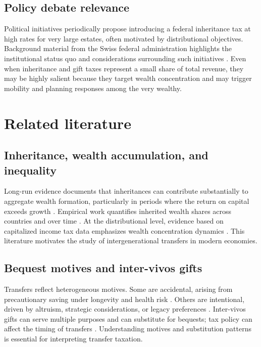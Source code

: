 \documentclass[11pt,a4paper]{article}
\begin{document}
\subsection{Policy debate relevance}
Political initiatives periodically propose introducing a federal inheritance tax at high rates for very large estates, often motivated by distributional objectives. Background material from the Swiss federal administration highlights the institutional status quo and considerations surrounding such initiatives \parencite{EFDJUSO2024}. Even when inheritance and gift taxes represent a small share of total revenue, they may be highly salient because they target wealth concentration and may trigger mobility and planning responses among the very wealthy.

\section{Related literature}
\label{sec:lit}

\subsection{Inheritance, wealth accumulation, and inequality}
Long-run evidence documents that inheritances can contribute substantially to aggregate wealth formation, particularly in periods where the return on capital exceeds growth \parencite{Piketty2014,PikettyZucman2015}. Empirical work quantifies inherited wealth shares across countries and over time \parencite{AlvaredoGarbintiPiketty2017}. At the distributional level, evidence based on capitalized income tax data emphasizes wealth concentration dynamics \parencite{SaezZucman2016}. This literature motivates the study of intergenerational transfers in modern economies.

\subsection{Bequest motives and inter-vivos gifts}
Transfers reflect heterogeneous motives. Some are accidental, arising from precautionary saving under longevity and health risk \parencite{Aiyagari1994,DeNardi2004}. Others are intentional, driven by altruism, strategic considerations, or legacy preferences \parencite{Bernheim1991,KopczukLupton2007}. Inter-vivos gifts can serve multiple purposes and can substitute for bequests; tax policy can affect the timing of transfers \parencite{Joulfaian2004}. Understanding motives and substitution patterns is essential for interpreting transfer taxation.
\end{document}
